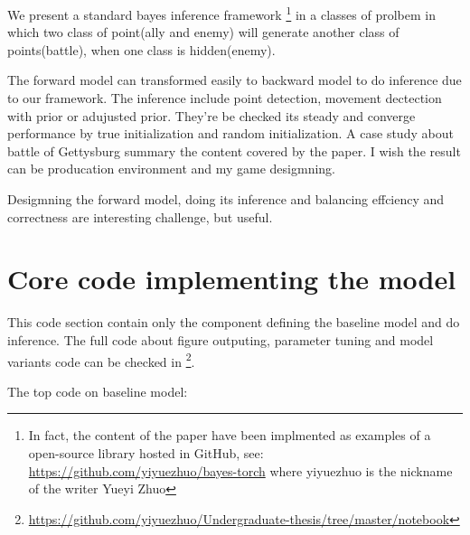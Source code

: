 \documentclass{article}
\begin{document}
We present a standard bayes inference framework 
\footnote{In fact, the content of the paper have been implmented as examples of a open-source library
hosted in GitHub, see: \url{https://github.com/yiyuezhuo/bayes-torch} where yiyuezhuo is the nickname of
the writer Yueyi Zhuo} 
in a classes of prolbem in which 
two class of point(ally and enemy) will generate another class of points(battle), 
when one class is hidden(enemy).

The forward model can transformed easily to backward model to do inference due to our framework.
The inference include point detection, movement dectection with prior or adujusted prior.
They're be checked its steady and converge performance by true initialization and random initialization.
A case study about battle of Gettysburg summary the content covered by the paper. 
I wish the result can be producation environment and my game desigmning.

Desigmning the forward model, doing its inference and balancing effciency and correctness 
are interesting challenge, but useful.

\section{Core code implementing the model}

This code section contain only the component defining the baseline model and do inference. 
The full code about figure outputing, parameter tuning and model variants code can be checked in 
\footnote{\url{https://github.com/yiyuezhuo/Undergraduate-thesis/tree/master/notebook}}.


The top code on baseline model:
\end{document}

